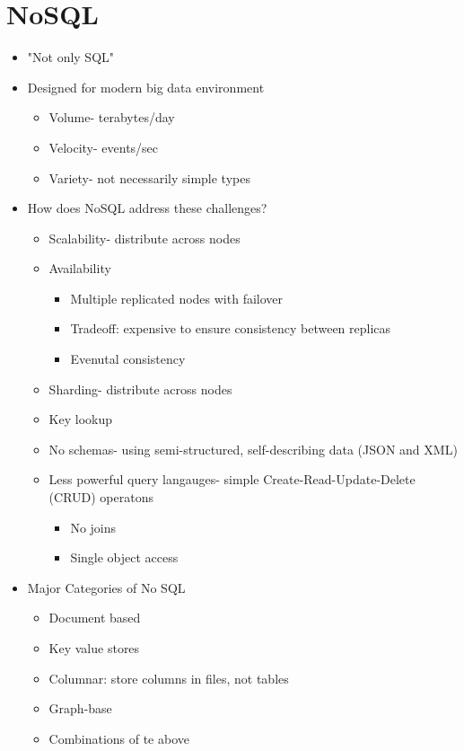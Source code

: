 \documentclass[12pt]{article}
\begin{document}
	\section*{NoSQL}
		\begin{itemize}
			\item
				"Not only SQL"
			\item
				Designed for modern big data environment
				\begin{itemize}
					\item
						Volume- terabytes/day
					\item
						Velocity- events/sec
					\item
						Variety- not necessarily simple types
				\end{itemize}
			\item
				How does NoSQL address these challenges?
				\begin{itemize}
					\item
						Scalability- distribute across nodes
					\item
						Availability
						\begin{itemize}
							\item
								Multiple replicated nodes with failover
							\item
								Tradeoff: expensive to ensure consistency between replicas
							\item
								Evenutal consistency
						\end{itemize}
					\item
						Sharding- distribute across nodes
					\item
						Key lookup
					\item
						No schemas- using semi-structured, self-describing data (JSON and XML)
					\item
						Less powerful query langauges- simple Create-Read-Update-Delete (CRUD) operatons
						\begin{itemize}
							\item
								No joins
							\item
								Single object access
						\end{itemize}
				\end{itemize}
			\item
				Major Categories of No SQL
				\begin{itemize}
					\item
						Document based
					\item
						Key value stores
					\item
						Columnar: store columns in files, not tables
					\item
						Graph-base
					\item
						Combinations of te above
				\end{itemize}
		\end{itemize}
		
\end{document}
